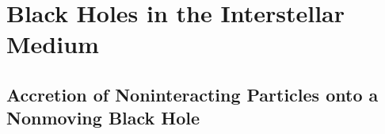 
\section{Black Holes in the Interstellar Medium}
\label{sec:4}


\subsection{Accretion of Noninteracting Particles onto a Nonmoving Black Hole}
\label{sec:4.1}

